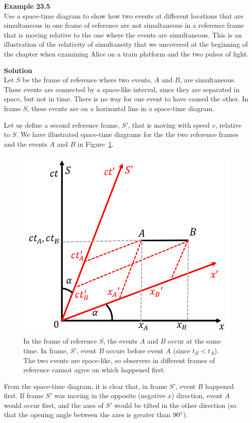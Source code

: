 \begin{framed}
\textbf{Example 23.5}\\
Use a space-time diagram to show how two events at different locations that are simultaneous in one frame of reference are not simultaneous in a reference frame that is moving relative to the one where the events are simultaneous. This is an illustration of the relativity of simultaneity that we uncovered at the beginning of the chapter when examining Alice on a train platform and the two pulses of light.

\begin{framed}
\textbf{Solution}\\
Let $S$ be the frame of reference where two events, $A$ and $B$, are simultaneous. These events are connected by a space-like interval, since they are separated in space, but not in time. There is no way for one event to have caused the other. In frame $S$, these events are on a horizontal line in a space-time diagram.

Let us define a second reference frame, $S'$, that is moving with speed $v$, relative to $S$. We have illustrated space-time diagrams for the the two reference frames and the events $A$ and $B$ in Figure~\ref{fig:specialrelativity:lorentz_simul}.

\begin{figure}[!htbp]
\centering
\includegraphics[width=0.6\linewidth]{files/lorentz_simul-dcb660c94da845ad6c4d1a23e49fe632.png}
\caption[]{In the frame of reference $S$, the events $A$ and $B$ occur at the same time. In frame, $S'$, event $B$ occurs before event $A$ (since $t_B < t_A$). The two events are space-like, so observers in different frames of reference cannot agree on which happened first.}
\label{fig:specialrelativity:lorentz_simul}
\end{figure}

From the space-time diagram, it is clear that, in frame $S'$, event $B$ happened first. If frame $S'$ was moving in the opposite (negative $x$) direction, event $A$ would occur first, and the axes of $S'$ would be tilted in the other direction (so that the opening angle between the axes is greater than $90 {\rm \degree}$).


\end{framed}
\end{framed}
